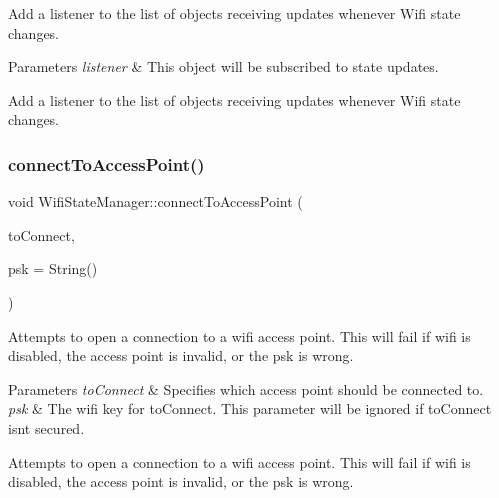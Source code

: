 Add a listener to the list of objects receiving updates whenever Wifi state changes.


\begin{DoxyParams}{Parameters}
{\em listener} & This object will be subscribed to state updates.\\
\hline
\end{DoxyParams}
Add a listener to the list of objects receiving updates whenever Wifi state changes. \mbox{\label{classWifiStateManager_adb3614524ad42b6d21dc394d6ce0c344}} 
\subsubsection{\texorpdfstring{connect\+To\+Access\+Point()}{connectToAccessPoint()}}
{\footnotesize\ttfamily void Wifi\+State\+Manager\+::connect\+To\+Access\+Point (\begin{DoxyParamCaption}\item[{\mbox{\hyperlink{classWifiAccessPoint_ad18977f884076774803027efbaa131a0}{Wifi\+Access\+Point\+::\+Ptr}}}]{to\+Connect,  }\item[{String}]{psk = {\ttfamily String()} }\end{DoxyParamCaption})}

Attempts to open a connection to a wifi access point. This will fail if wifi is disabled, the access point is invalid, or the psk is wrong.


\begin{DoxyParams}{Parameters}
{\em to\+Connect} & Specifies which access point should be connected to.\\
\hline
{\em psk} & The wifi key for to\+Connect. This parameter will be ignored if to\+Connect isn\textquotesingle{}t secured.\\
\hline
\end{DoxyParams}
Attempts to open a connection to a wifi access point. This will fail if wifi is disabled, the access point is invalid, or the psk is wrong. \mbox{\label{classWifiStateManager_a5c6b95e776d893ed4b8686de6577cc36}} 
